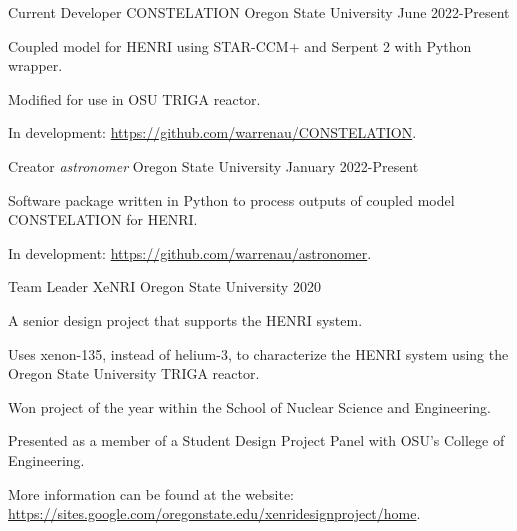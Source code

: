 
\begin{cventries}
  \cventry
    {Current Developer}      %
    {CONSTELATION}           %
    {Oregon State University}%
    {June 2022-Present}   %
    {
    \begin{cvitems}
        \item{Coupled model for HENRI using STAR-CCM+ and Serpent 2 with Python wrapper.}
        \item{Modified for use in OSU TRIGA reactor.}
        \item{In development: \href{https://github.com/warrenau/CONSTELATION/tree/ostr}{https://github.com/warrenau/CONSTELATION}.}
    \end{cvitems}
    }


  \cventry
    {Creator}                %
    {\textit{astronomer}}             %
    {Oregon State University}%
    {January 2022-Present}   %
    {
    \begin{cvitems}
        \item{Software package written in Python to process outputs of coupled model CONSTELATION for HENRI.}
        \item{In development: \href{https://github.com/warrenau/astronomer}{https://github.com/warrenau/astronomer}.}
    \end{cvitems}
    }

  
  \cventry
    {Team Leader} %
    {XeNRI} %
    {Oregon State University} %
    {2020} %
    {
      \begin{cvitems} %
        \item{A senior design project that supports the HENRI system.}
		\item {Uses xenon-135, instead of helium-3, to characterize the HENRI system using the Oregon State University TRIGA reactor.}
		\item {Won project of the year within the School of Nuclear Science and Engineering.}
		\item{Presented as a member of a Student Design Project Panel with OSU's College of Engineering.}
        \item{More information can be found at the website: \href{https://sites.google.com/oregonstate.edu/xenridesignproject/home}{https://sites.google.com/oregonstate.edu/xenridesignproject/home}.}
      \end{cvitems}
    }



\end{cventries}
